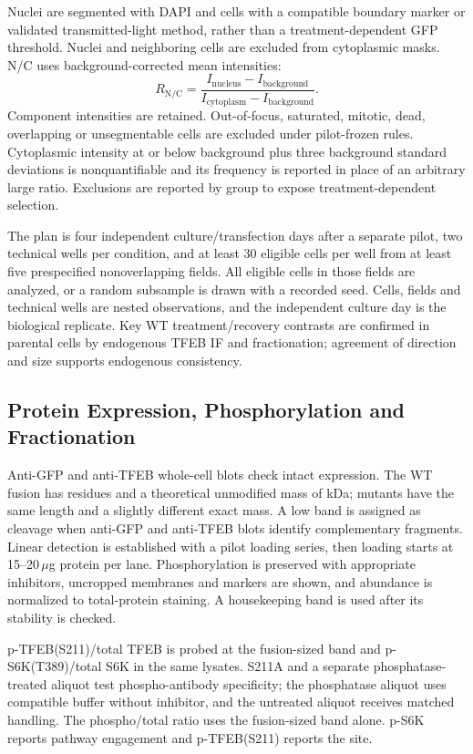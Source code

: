 Nuclei are segmented with DAPI and cells with a compatible boundary marker or validated transmitted-light method, rather than a treatment-dependent GFP threshold. Nuclei and neighboring cells are excluded from cytoplasmic masks. N/C uses background-corrected mean intensities:
\begin{equation}
R_{\mathrm{N/C}}=\frac{I_{\mathrm{nucleus}}-I_{\mathrm{background}}}{I_{\mathrm{cytoplasm}}-I_{\mathrm{background}}}.
\end{equation}
Component intensities are retained. Out-of-focus, saturated, mitotic, dead, overlapping or unsegmentable cells are excluded under pilot-frozen rules. Cytoplasmic intensity at or below background plus three background standard deviations is nonquantifiable and its frequency is reported in place of an arbitrary large ratio. Exclusions are reported by group to expose treatment-dependent selection.

The plan is four independent culture/transfection days after a separate pilot, two technical wells per condition, and at least 30 eligible cells per well from at least five prespecified nonoverlapping fields. All eligible cells in those fields are analyzed, or a random subsample is drawn with a recorded seed. Cells, fields and technical wells are nested observations, and the independent culture day is the biological replicate. Key WT treatment/recovery contrasts are confirmed in parental cells by endogenous TFEB IF and fractionation; agreement of direction and size supports endogenous consistency.

\subsection{Protein Expression, Phosphorylation and Fractionation}
Anti-GFP and anti-TFEB whole-cell blots check intact expression. The WT fusion has \FusionAa{} residues and a theoretical unmodified mass of \FusionMassKDa{} kDa; mutants have the same length and a slightly different exact mass. A low band is assigned as cleavage when anti-GFP and anti-TFEB blots identify complementary fragments. Linear detection is established with a pilot loading series, then loading starts at 15--20\,$\mu$g protein per lane. Phosphorylation is preserved with appropriate inhibitors, uncropped membranes and markers are shown, and abundance is normalized to total-protein staining. A housekeeping band is used after its stability is checked.

p-TFEB(S211)/total TFEB is probed at the fusion-sized band and p-S6K(T389)/total S6K in the same lysates. S211A and a separate phosphatase-treated aliquot test phospho-antibody specificity; the phosphatase aliquot uses compatible buffer without inhibitor, and the untreated aliquot receives matched handling. The phospho/total ratio uses the fusion-sized band alone. p-S6K reports pathway engagement and p-TFEB(S211) reports the site.

